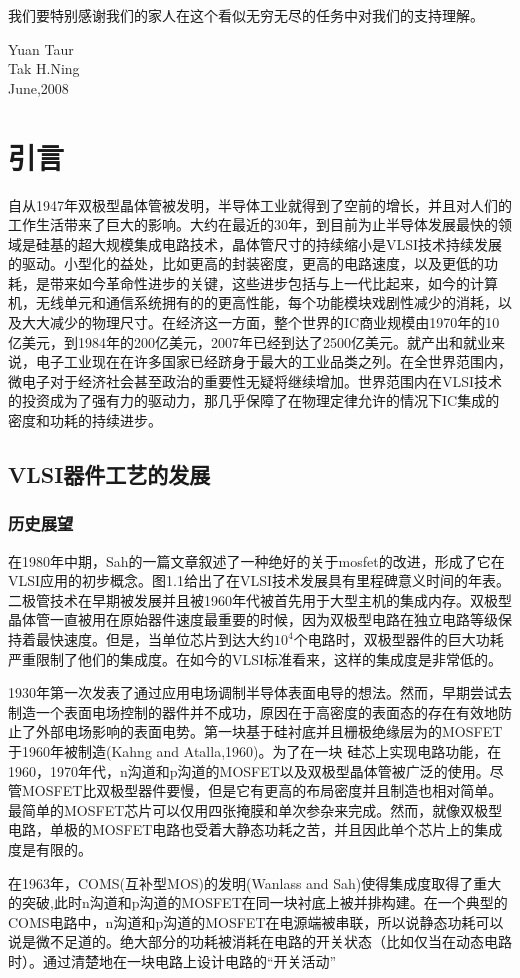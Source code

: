 \documentclass[cn,11pt,chinese]{elegantbook}
\begin{document}
我们要特别感谢我们的家人在这个看似无穷无尽的任务中对我们的支持理解。
\vskip 1.5cm

\begin{flushright}
	Yuan Taur\\
	Tak H.Ning\\
    June,2008
\end{flushright}

\tableofcontents
\mainmatter
\chapter{引言}
自从1947年双极型晶体管被发明，半导体工业就得到了空前的增长，并且对人们的工作生活带来了巨大的影响。大约在最近的30年，到目前为止半导体发展最快的领域是硅基的超大规模集成电路技术，晶体管尺寸的持续缩小是VLSI技术持续发展的驱动。小型化的益处，比如更高的封装密度，更高的电路速度，以及更低的功耗，是带来如今革命性进步的关键，这些进步包括与上一代比起来，如今的计算机，无线单元和通信系统拥有的的更高性能，每个功能模块戏剧性减少的消耗，以及大大减少的物理尺寸。在经济这一方面，整个世界的IC商业规模由1970年的10亿美元，到1984年的200亿美元，2007年已经到达了2500亿美元。就产出和就业来说，电子工业现在在许多国家已经跻身于最大的工业品类之列。在全世界范围内，微电子对于经济社会甚至政治的重要性无疑将继续增加。世界范围内在VLSI技术的投资成为了强有力的驱动力，那几乎保障了在物理定律允许的情况下IC集成的密度和功耗的持续进步。

\section{VLSI器件工艺的发展}
\subsection{历史展望}
在1980年中期，Sah的一篇文章叙述了一种绝好的关于mosfet的改进，形成了它在VLSI应用的初步概念。图1.1给出了在VLSI技术发展具有里程碑意义时间的年表。二极管技术在早期被发展并且被1960年代被首先用于大型主机的集成内存。双极型晶体管一直被用在原始器件速度最重要的时候，因为双极型电路在独立电路等级保持着最快速度。但是，当单位芯片到达大约$10^4$个电路时，双极型器件的巨大功耗严重限制了他们的集成度。在如今的VLSI标准看来，这样的集成度是非常低的。

1930年第一次发表了通过应用电场调制半导体表面电导的想法。然而，早期尝试去制造一个表面电场控制的器件并不成功，原因在于高密度的表面态的存在有效地防止了外部电场影响的表面电势。第一块基于硅衬底并且栅极绝缘层为的MOSFET于1960年被制造(Kahng and Atalla,1960)。为了在一块 硅芯上实现电路功能，在1960，1970年代，n沟道和p沟道的MOSFET以及双极型晶体管被广泛的使用。尽管MOSFET比双极型器件要慢，但是它有更高的布局密度并且制造也相对简单。最简单的MOSFET芯片可以仅用四张掩膜和单次参杂来完成。然而，就像双极型电路，单极的MOSFET电路也受着大静态功耗之苦，并且因此单个芯片上的集成度是有限的。


在1963年，COMS(互补型MOS)的发明(Wanlass and Sah)使得集成度取得了重大的突破,此时n沟道和p沟道的MOSFET在同一块衬底上被并排构建。在一个典型的COMS电路中，n沟道和p沟道的MOSFET在电源端被串联，所以说静态功耗可以说是微不足道的。绝大部分的功耗被消耗在电路的开关状态（比如仅当在动态电路时）。通过清楚地在一块电路上设计电路的“开关活动”
\end{document}
